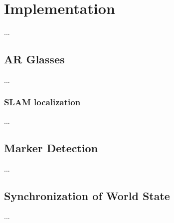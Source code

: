 \chapter{Implementation} \label{cha:implementation}
	...
	
	\section{AR Glasses} \label{sec:arglasses}
		...
		\subsection{SLAM localization} \label{ssec:slamloc}
			...

	\section{Marker Detection} \label{sec:markerdetection}
		...
		
	\section{Synchronization of World State} \label{sec:synchronization}
		...
	
	